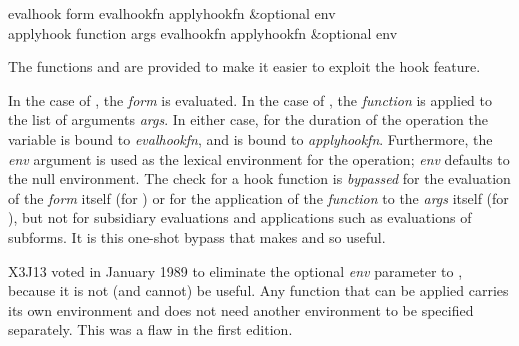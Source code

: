 \begin{defun}[Function]
evalhook form evalhookfn applyhookfn &optional env \\
applyhook function args evalhookfn applyhookfn &optional env

The functions  and  are provided to make it
easier to exploit the hook feature.

In the case of , the \emph{form} is evaluated.
In the case of , the \emph{function} is applied to the
list of arguments \emph{args}.  In either case,
for the duration of the operation
the variable  is bound to \emph{evalhookfn}, and
 is bound to \emph{applyhookfn}.
Furthermore, the \emph{env} argument
is used as the lexical environment for the operation;
\emph{env} defaults to the null environment.
The check for a hook function is \emph{bypassed} for the evaluation
of the \emph{form} itself (for ) or for the application
of the \emph{function} to the \emph{args} itself (for ),
but not for subsidiary evaluations and applications
such as evaluations of subforms.  It is this one-shot bypass that makes
 and  so useful.

\begin{new}
X3J13 voted in January 1989
to eliminate the optional \emph{env}
parameter to , because it is not (and cannot)
be useful.  Any function that can be applied carries its own
environment and does not need another environment to be specified
separately.
This was a flaw in the first edition.
\end{new}


\end{defun}
